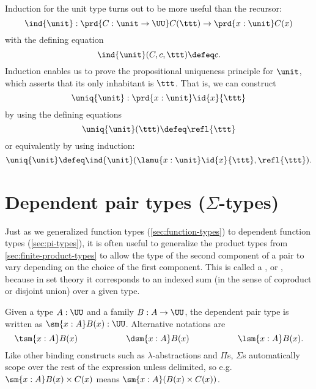
Induction for the unit type turns out to be more useful than the
recursor: 
%
\[ \ind{\unit} : \prd{C:\unit \to \UU} C(\ttt) \to \prd{x:\unit}C(x)\]
with the defining equation
\[ \ind{\unit}(C,c,\ttt) \defeq c. \]
Induction enables us to prove the propositional uniqueness principle for $\unit$, which asserts that its only inhabitant is $\ttt$.
That is, we can construct
\label{uniquenessunit}
\[\uniq{\unit} : \prd{x:\unit} \id{x}{\ttt} \]
by using the defining equations
\[\uniq{\unit}(\ttt) \defeq \refl{\ttt} \]
or equivalently by using induction:
\[\uniq{\unit} \defeq \ind{\unit}(\lamu{x:\unit} \id{x}{\ttt},\refl{\ttt}). \]

%
%

\section{Dependent pair types (\texorpdfstring{$\Sigma$}{Σ}-types)}
\label{sec:sigma-types}

%
%
%
%
%

Just as we generalized function types (\cref{sec:function-types}) to dependent function types (\cref{sec:pi-types}), it is often useful to generalize the product types from \cref{sec:finite-product-types} to allow the type of
the second component of a pair to vary depending on the choice of the first
component. This is called a , or , because in set theory it
corresponds to an indexed sum (in the sense of coproduct or
disjoint union) over a given type.

Given a type $A:\UU$ and a family $B : A \to \UU$, the dependent
pair type is written as $\sm{x:A} B(x) : \UU$.
Alternative notations are 
\[ \tsm{x:A} B(x) \hspace{2cm} \dsm{x:A}B(x) \hspace{2cm} \lsm{x:A} B(x). \]
Like other binding constructs such as $\lambda$-abstractions and $\Pi$s, $\Sigma$s automatically scope over the rest of the expression unless delimited, so e.g.\ $\sm{x:A} B(x) \times C(x)$ means $\sm{x:A} (B(x) \times C(x))$.

